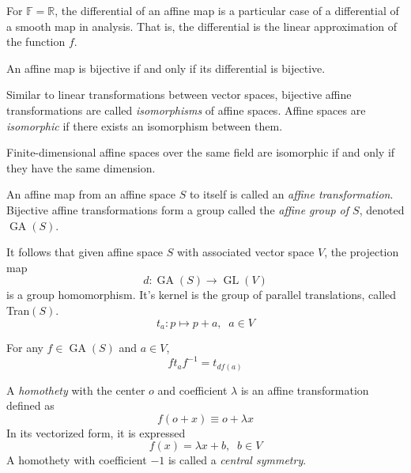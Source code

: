 \documentclass{article}
\DeclareMathOperator{\GL}{GL}
\DeclareMathOperator{\GA}{GA}
\begin{document}
    For $\mathbb{F} = \mathbb{R}$, the differential of an affine map is a particular case of a differential of a smooth map in analysis. That is, the differential is the linear approximation of the function $f$. 

    \begin{proposition}
      An affine map is bijective if and only if its differential is bijective. 
    \end{proposition}

    \begin{definition}
      Similar to linear transformations between vector spaces, bijective affine transformations are called \textit{isomorphisms} of affine spaces. Affine spaces are \textit{isomorphic} if there exists an isomorphism between them. 
    \end{definition}

    \begin{corollary}
      Finite-dimensional affine spaces over the same field are isomorphic if and only if they have the same dimension. 
    \end{corollary}

    \begin{definition}
      An affine map from an affine space $S$ to itself is called an \textit{affine transformation}. Bijective affine transformations form a group called the \textit{affine group of $S$}, denoted $\GA(S)$. 
    \end{definition}

    It follows that given affine space $S$ with associated vector space $V$, the projection map
    \begin{equation}
      d: \GA(S) \longrightarrow \GL(V)
    \end{equation}
    is a group homomorphism. It's kernel is the group of parallel translations, called Tran$(S)$. 
    \begin{equation}
      t_a : p \mapsto p + a, \;\; a \in V
    \end{equation}

    \begin{proposition}
      For any $f \in \GA(S)$ and $a \in V$, 
      \begin{equation}
        f t_a f^{-1} = t_{df(a)}
      \end{equation}
    \end{proposition}

    \begin{definition}
      A \textit{homothety} with the center $o$ and coefficient $\lambda$ is an affine transformation defined as
      \begin{equation}
        f( o + x ) \equiv o + \lambda x
      \end{equation}
      In its vectorized form, it is expressed
      \begin{equation}
        f(x) = \lambda x + b, \;\; b \in V
      \end{equation}
      A homothety with coefficient $-1$ is called a \textit{central symmetry}. 
    \end{definition}
\end{document}
